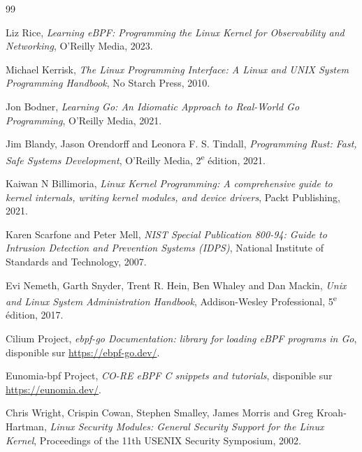 \documentclass[11pt,a4paper]{article}
\begin{document}
\begin{thebibliography}{99}

Liz Rice, \emph{Learning eBPF: Programming the Linux Kernel for Observability and Networking}, O'Reilly Media, 2023.

Michael Kerrisk, \emph{The Linux Programming Interface: A Linux and UNIX System Programming Handbook}, No Starch Press, 2010.

Jon Bodner, \emph{Learning Go: An Idiomatic Approach to Real-World Go Programming}, O'Reilly Media, 2021.

Jim Blandy, Jason Orendorff and Leonora F. S. Tindall, \emph{Programming Rust: Fast, Safe Systems Development}, O'Reilly Media, 2\textsuperscript{e} édition, 2021.

Kaiwan N Billimoria, \emph{Linux Kernel Programming: A comprehensive guide to kernel internals, writing kernel modules, and device drivers}, Packt Publishing, 2021.

Karen Scarfone and Peter Mell, \emph{NIST Special Publication 800-94: Guide to Intrusion Detection and Prevention Systems (IDPS)}, National Institute of Standards and Technology, 2007.

Evi Nemeth, Garth Snyder, Trent R. Hein, Ben Whaley and Dan Mackin, \emph{Unix and Linux System Administration Handbook}, Addison-Wesley Professional, 5\textsuperscript{e} édition, 2017.

Cilium Project, \emph{ebpf-go Documentation: library for loading eBPF programs in Go}, disponible sur \url{https://ebpf-go.dev/}.

Eunomia-bpf Project, \emph{CO-RE eBPF C snippets and tutorials}, disponible sur \url{https://eunomia.dev/}.

Chris Wright, Crispin Cowan, Stephen Smalley, James Morris and Greg Kroah-Hartman, \emph{Linux Security Modules: General Security Support for the Linux Kernel}, Proceedings of the 11th USENIX Security Symposium, 2002.

\end{thebibliography}
\end{document}
